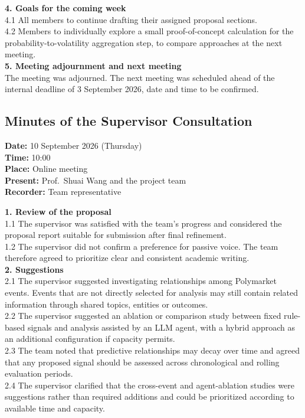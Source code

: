 \textbf{4. Goals for the coming week} \\
4.1 All members to continue drafting their assigned proposal sections. \\
4.2 Members to individually explore a small proof-of-concept calculation for the probability-to-volatility aggregation step, to compare approaches at the next meeting. \\

\textbf{5. Meeting adjournment and next meeting} \\
The meeting was adjourned. The next meeting was scheduled ahead of the internal deadline of 3 September 2026, date and time to be confirmed.

\clearpage
\subsection{Minutes of the Supervisor Consultation}

\textbf{Date:} 10 September 2026 (Thursday) \\
\textbf{Time:} 10:00 \\
\textbf{Place:} Online meeting \\
\textbf{Present:} Prof.\ Shuai Wang and the project team \\
\textbf{Recorder:} Team representative

\textbf{1. Review of the proposal} \\
1.1 The supervisor was satisfied with the team's progress and considered the proposal report suitable for submission after final refinement. \\
1.2 The supervisor did not confirm a preference for passive voice. The team therefore agreed to prioritize clear and consistent academic writing. \\

\textbf{2. Suggestions} \\
2.1 The supervisor suggested investigating relationships among Polymarket events. Events that are not directly selected for analysis may still contain related information through shared topics, entities or outcomes. \\
2.2 The supervisor suggested an ablation or comparison study between fixed rule-based signals and analysis assisted by an LLM agent, with a hybrid approach as an additional configuration if capacity permits. \\
2.3 The team noted that predictive relationships may decay over time and agreed that any proposed signal should be assessed across chronological and rolling evaluation periods. \\
2.4 The supervisor clarified that the cross-event and agent-ablation studies were suggestions rather than required additions and could be prioritized according to available time and capacity. \\

